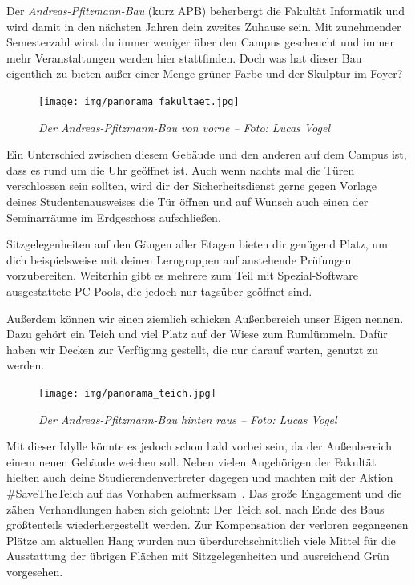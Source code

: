 
Der \emph{Andreas-Pfitzmann-Bau} (kurz APB) beherbergt die Fakultät Informatik und wird damit in den nächsten Jahren dein zweites Zuhause sein.
Mit zunehmender Semesterzahl wirst du immer weniger über den Campus gescheucht und immer mehr Veranstaltungen werden hier stattfinden.
Doch was hat dieser Bau eigentlich zu bieten außer einer Menge grüner Farbe und der Skulptur im Foyer?

\begin{figure}[h!]
    \centering
    \texttt{[image: img/panorama\_fakultaet.jpg]}
    \caption*{\small \textit{Der Andreas-Pfitzmann-Bau von vorne -- Foto: Lucas Vogel}}
\end{figure}

Ein Unterschied zwischen diesem Gebäude und den anderen auf dem Campus ist, dass es rund um die Uhr geöffnet ist. Auch wenn nachts mal die Türen verschlossen sein sollten, wird dir der Sicherheitsdienst gerne gegen Vorlage deines Studentenausweises die Tür öffnen und auf Wunsch auch einen der Seminarräume im Erdgeschoss aufschließen.

Sitzgelegenheiten auf den Gängen aller Etagen bieten dir genügend Platz, um dich beispielsweise mit deinen Lerngruppen auf anstehende Prüfungen vorzubereiten. Weiterhin gibt es mehrere zum Teil mit Spezial-Software ausgestattete PC-Pools, die jedoch nur tagsüber geöffnet sind.

\label{sec:apb}
Außerdem können wir einen ziemlich schicken Außenbereich unser Eigen nennen. Dazu gehört ein Teich und viel Platz auf der Wiese zum Rumlümmeln. Dafür haben wir Decken zur Verfügung gestellt, die nur darauf warten, genutzt zu werden.

\begin{figure}[t]
    \centering
    \texttt{[image: img/panorama\_teich.jpg]}
    \caption*{\small \textit{Der Andreas-Pfitzmann-Bau hinten raus -- Foto: Lucas Vogel}}
\end{figure}

Mit dieser Idylle könnte es jedoch schon bald vorbei sein, da der Außenbereich einem neuen Gebäude weichen soll. Neben vielen Angehörigen der Fakultät hielten auch deine Studierendenvertreter dagegen und machten mit der Aktion \#SaveTheTeich auf das Vorhaben aufmerksam~.
Das große Engagement und die zähen Verhandlungen haben sich gelohnt: Der Teich soll nach Ende des Baus größtenteils wiederhergestellt werden. Zur Kompensation der verloren gegangenen Plätze am aktuellen Hang wurden nun überdurchschnittlich viele Mittel für die Ausstattung der übrigen Flächen mit Sitzgelegenheiten und ausreichend Grün vorgesehen.

